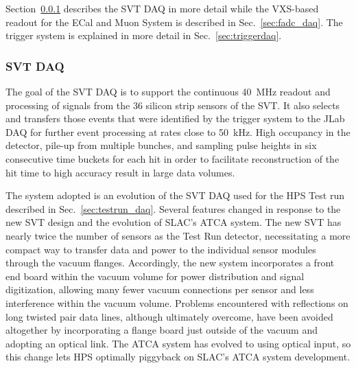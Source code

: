 Section~\ref{sec:svt_daq} describes the SVT DAQ in more detail while the VXS-based readout for 
the ECal and Muon System is described in Sec.~\ref{sec:fadc_daq}. The trigger 
system is explained in more detail in Sec.~\ref{sec:triggerdaq}.

\subsubsection{SVT DAQ}
\label{sec:svt_daq}
The goal of the SVT DAQ is to support the continuous 40~MHz readout and processing of signals from 
the 36 silicon strip sensors of the SVT. It also selects and transfers those events that were identified by the 
trigger system to the JLab DAQ for further event processing at rates 
close to 50~kHz.  
High occupancy in the detector, pile-up from multiple bunches,
and sampling pulse heights in six consecutive time buckets for each hit in order to facilitate 
reconstruction of the hit time to high accuracy result in large data volumes. 

The system adopted is an evolution of the SVT DAQ used for the HPS Test run described in 
Sec.~\ref{sec:testrun_daq}. Several features changed in
response to the new SVT design and the evolution of SLAC's ATCA system. The new SVT has nearly twice 
the number of sensors as the Test Run detector, 
necessitating a more compact way to transfer data and power to the individual sensor modules through the
vacuum flanges. Accordingly, the new system incorporates a front end board within the vacuum volume for 
power distribution and signal digitization,
allowing many fewer vacuum connections per sensor and less interference within the vacuum volume. 
Problems encountered with reflections on long twisted pair
data lines, although ultimately overcome, have been avoided altogether by incorporating a flange board just 
outside of the vacuum and adopting an optical link. The ATCA system has evolved to using optical input, so 
this change lets HPS optimally piggyback on SLAC's ATCA system development.  

